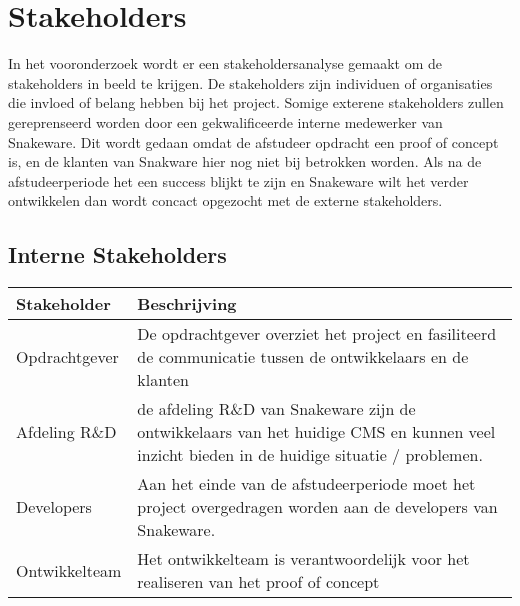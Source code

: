 \section{Stakeholders}
In het vooronderzoek wordt er een stakeholdersanalyse gemaakt om de stakeholders in beeld te krijgen.
De stakeholders zijn individuen of organisaties die invloed of belang hebben bij het project.
Somige exterene stakeholders zullen gereprenseerd worden door een gekwalificeerde interne medewerker van Snakeware.
Dit wordt gedaan omdat de afstudeer opdracht een proof of concept is, en de klanten van Snakware hier nog niet bij betrokken worden. 
Als na de afstudeerperiode het een success blijkt te zijn en Snakeware wilt het verder ontwikkelen dan wordt concact opgezocht met de externe stakeholders.
\subsection{Interne Stakeholders}
\begin{tabular}{ | p{4cm} | p{9cm} | }
	\hline
	\textbf{Stakeholder} & \textbf{Beschrijving}                                                                                                                      \\
	\hline
	Opdrachtgever       & De opdrachtgever overziet het project en fasiliteerd de communicatie tussen de ontwikkelaars en de klanten                                 \\
	\hline
	Afdeling R\&D        & de afdeling R\&D van Snakeware zijn de ontwikkelaars van het huidige CMS en kunnen veel inzicht bieden in de huidige situatie / problemen. \\
	\hline
	Developers           & Aan het einde van de afstudeerperiode moet het project overgedragen worden aan de developers van Snakeware.                                \\
	\hline
	Ontwikkelteam        & Het ontwikkelteam is verantwoordelijk voor het realiseren van het proof of concept                                                         \\
	\hline
\end{tabular}
